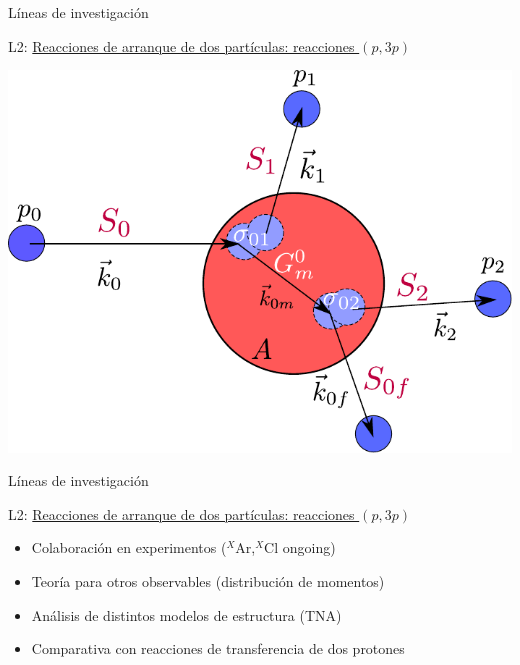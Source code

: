 \documentclass{beamer}
\begin{document}
\begin{frame}{Líneas de investigación} 

\large {}  L2: \underline{Reacciones de arranque de dos partículas: reacciones $(p, 3p)$} 

\normalsize
\begin{center}    
\includegraphics[height=0.5\textheight]{model.pdf}   
\end{center}
    
\end{frame}

\begin{frame}{Líneas de investigación} 

\large {}  L2: \underline{Reacciones de arranque de dos partículas: reacciones $(p, 3p)$} 

\normalsize
    
\begin{itemize}
\item Colaboración en experimentos ($^X$Ar,$^X$Cl ongoing)
\item Teoría para otros observables (distribución de momentos)
\item Análisis de distintos modelos de estructura (TNA)
\item Comparativa con reacciones de transferencia de dos protones


\end{itemize}    
    
\end{frame}
\end{document}
